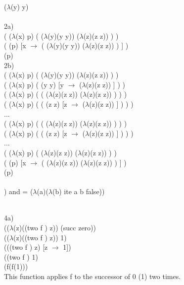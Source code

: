 \documentclass[12pt]{article}
\begin{document}
\noindent($\lambda$(y) y)\\

\hrulefill \\

\noindent 2a)\\
( ($\lambda$(x) p) ( ($\lambda$(y)(y y)) ($\lambda$(z)(z z)) ) )\\
( (p) [x $\to$ ( ($\lambda$(y)(y y)) ($\lambda$(z)(z z)) ) ] )\\
(p)\\


\noindent 2b)\\
\noindent( ($\lambda$(x) p) ( ($\lambda$(y)(y y)) ($\lambda$(z)(z z)) ) )\\
( ($\lambda$(x) p) ( (y y) [y $\to$ ($\lambda$(z)(z z)) ] ) )\\

\noindent( ($\lambda$(x) p) ( ( ($\lambda$(z)(z z)) ($\lambda$(z)(z z)) ) ) )\\
( ($\lambda$(x) p) ( ( (z z) [z $\to$ ($\lambda$(z)(z z)) ] ) ) )\\
...\\
\noindent( ($\lambda$(x) p) ( ( ($\lambda$(z)(z z)) ($\lambda$(z)(z z)) ) ) )\\
( ($\lambda$(x) p) ( ( (z z) [z $\to$ ($\lambda$(z)(z z)) ] ) ) )\\
...\\

\noindent( ($\lambda$(x) p) ( ($\lambda$(z)(z z)) ($\lambda$(z)(z z)) ) )\\
( (p) [x $\to$ ( ($\lambda$(z)(z z)) ($\lambda$(z)(z z)) ) ] )\\
(p)\\

\hrulefill \\

) and = ($\lambda$(a)($\lambda$(b) ite a b false)) \\

\hrulefill \\

\pagebreak

\noindent 4a) \\
(($\lambda$(z)((two f ) z)) (succ zero))\\
(($\lambda$(z)((two f ) z)) 1)\\
(((two f ) z) [z $\to$ 1])\\
((two f ) 1)\\
(f(f(1)))\\
This function applies f to the successor of 0 (1) two times.\\
\end{document}

